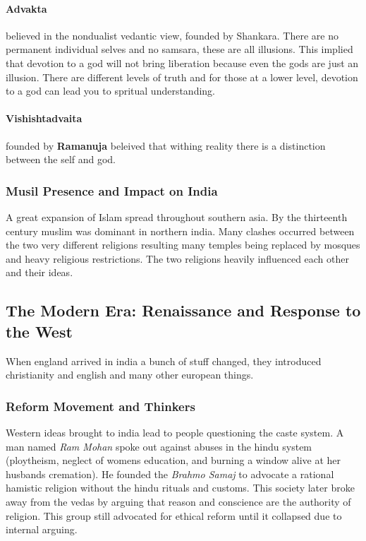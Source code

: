 \documentclass{article}
\begin{document}
\paragraph{Advakta}
\label{par:advakta}
believed in the nondualist vedantic view, founded by Shankara. There are no permanent individual selves and no samsara, these are all illusions. This implied that devotion to a god will not bring liberation because even the gods are just an illusion. There are different levels of truth and for those at a lower level, devotion to a god can lead you to spritual understanding.

\paragraph{Vishishtadvaita}
\label{par:vishishtadvaita}
founded by \textbf{Ramanuja} beleived that withing reality there is a distinction between the self and god.

\subsubsection{Musil Presence and Impact on India}
\label{ssub:musil_presence_and_impact_on_india}
A great expansion of Islam spread throughout southern asia. By the thirteenth century muslim was dominant in northern india. Many clashes occurred between the two very different religions resulting many temples being replaced by mosques and heavy religious restrictions. The two religions heavily influenced each other and their ideas.

\subsection{The Modern Era: Renaissance and Response to the West}
\label{sec:the_modern_era_remaossamce_amd_res}
When england arrived in india a bunch of stuff changed, they introduced christianity and english and many other european things.

\subsubsection{Reform Movement and Thinkers}
\label{ssub:reform_movement_and_thinkers}
Western ideas brought to india lead to people questioning the caste system. A man named \emph{Ram Mohan} spoke out against abuses in the hindu system (ploytheism, neglect of womens education, and burning a window alive at her husbands cremation). He founded the \emph{Brahmo Samaj} to advocate a rational hamistic religion without the hindu rituals and customs. This society later broke away from the vedas by arguing that reason and conscience are the authority of religion. This group still advocated for ethical reform until it collapsed due to internal arguing.
\end{document}
